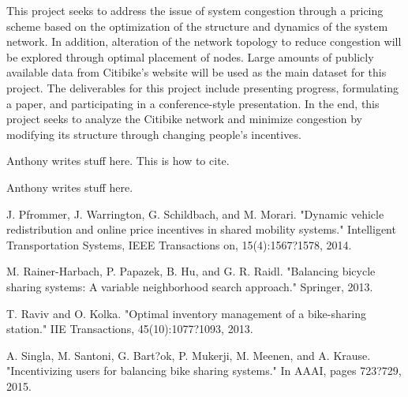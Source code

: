 \documentclass[times, 10pt,twocolumn]{article}
\begin{document}
This project seeks to address the issue of system congestion through a pricing scheme based on the optimization of the structure and dynamics of the system network. In addition, alteration of the network topology to reduce congestion will be explored through optimal placement of nodes. Large amounts of publicly available data from Citibike's website will be used as the main dataset for this project. The deliverables for this project include presenting progress, formulating a paper, and participating in a conference-style presentation. In the end, this project seeks to analyze the Citibike network and minimize congestion by modifying its structure through changing people's incentives.


Anthony writes stuff here. This is how to cite. \cite{redistribution} %


Anthony writes stuff here.

\nocite{ex1,ex2}



\begin{thebibliography}{}

J. Pfrommer, J. Warrington, G. Schildbach, and M. Morari. "Dynamic vehicle redistribution and online price incentives in shared mobility systems." Intelligent Transportation Systems, IEEE Transactions on, 15(4):1567?1578, 2014.

M. Rainer-Harbach, P. Papazek, B. Hu, and G. R. Raidl. "Balancing bicycle sharing systems: A variable neighborhood search approach." Springer, 2013.

T. Raviv and O. Kolka. "Optimal inventory management of a bike-sharing station." IIE Transactions, 45(10):1077?1093, 2013.

A. Singla, M. Santoni, G. Bart?ok, P. Mukerji, M. Meenen, and A. Krause. "Incentivizing users for balancing bike sharing systems." In AAAI, pages 723?729, 2015.

\end{thebibliography}
\end{document}
